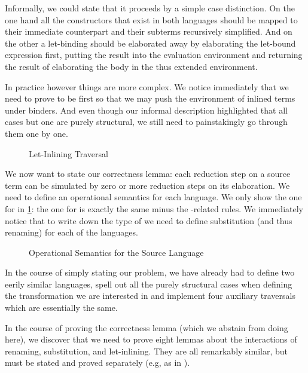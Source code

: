 Informally, we could state that it proceeds by a simple case distinction.
On the one hand all the constructors that exist in both languages should
be mapped to their immediate counterpart and their subterms recursively
simplified. And on the other a let-binding should be elaborated away by
elaborating the let-bound expression first, putting the result into the
evaluation environment and returning the result of elaborating the body
in the thus extended environment.

In practice however things are more complex. We notice immediately that
we need to prove  to be  first so that we may push
the environment of inlined terms under binders. And even though our informal
description highlighted that all cases but one are purely structural, we
still need to painstakingly go through them one by one.

\begin{figure}[h]
\caption{Let-Inlining Traversal}
\end{figure}

We now want to state our correctness lemma: each reduction step on a source
term can be simulated by zero or more reduction steps on its elaboration.
We need to define an operational semantics for each language. We only show
the one for  in \cref{fig:opersem}: the one for  is exactly the
same minus the -related rules. We immediately notice that to write
down the type of  we need to define substitution (and thus renaming)
for each of the languages.

\begin{figure}[h]
\caption{Operational Semantics for the Source Language\label{fig:opersem}}
\end{figure}

In the course of simply stating our problem, we have already had to define
two eerily similar languages, spell out all the purely structural cases
when defining the transformation we are interested in and implement four
auxiliary traversals which are essentially the same.

In the course of proving the correctness lemma (which we abstain from
doing here), we discover that we need to prove eight lemmas about the
interactions of renaming, substitution, and let-inlining. They are all
remarkably similar, but must be stated and proved separately (e.g, as
in \cite{benton2012strongly}).

